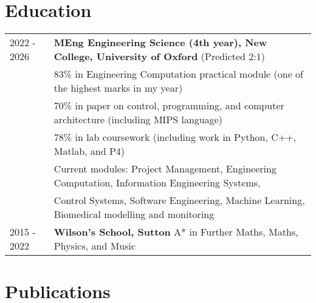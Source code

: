 \documentclass[a4paper,12pt]{article}
\begin{document}
\section{Education}
\begin{tabularx}{\linewidth}{@{}l X@{}}
2022 - 2026 & \textbf{MEng Engineering Science (4th year), New College, University of Oxford} \hfill \normalsize (Predicted 2:1) \\
& 83\% in Engineering Computation practical module (one of the highest marks in my year) \\
& 70\% in paper on control, programming, and computer architecture (including MIPS language) \\
& 78\% in lab coursework (including work in Python, C++, Matlab, and P4) \\
& Current modules: Project Management, Engineering Computation, Information Engineering Systems, \\
& Control Systems, Software Engineering, Machine Learning, Biomedical modelling and monitoring \\[8pt]

2015 - 2022 & \textbf{Wilson's School, Sutton} \hfill A* in Further Maths, Maths, Physics, and Music \\
\end{tabularx}

\section{Publications}
\begin{refsection}
\nocite{*}
\printbibliography[heading=none]
\end{refsection}

\end{document}
